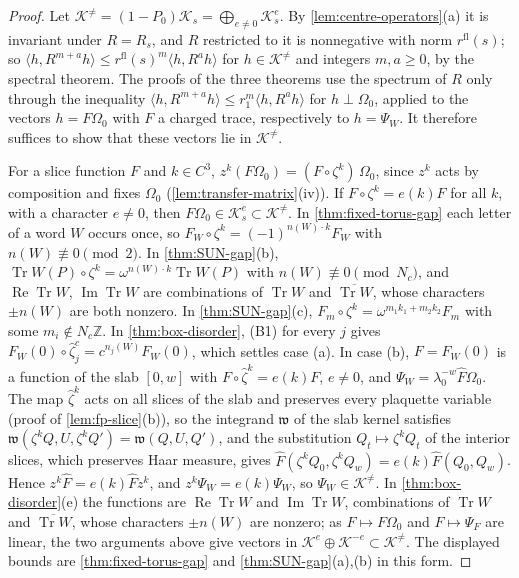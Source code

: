 \documentclass[11pt,a4paper]{amsart}
\theoremstyle{definition}
\theoremstyle{remark}
\numberwithin{equation}{section}
\DeclareMathOperator{\Tr}{Tr}        %
\newcommand{\Z}{\mathbb{Z}}          %
\newcommand{\Kspace}{\mathcal{K}}    %
\newcommand{\ip}[2]{\langle #1,#2\rangle}  %
\newcommand{\lzero}{\lambda_0}             %
\newcommand{\Omegazero}{\Omega_0}          %
\begin{document}
\begin{proof}
Let $\Kspace^{\ne}=(1-P_0)\Kspace_s=\bigoplus_{e\ne0}\Kspace^e_s$. By \cref{lem:centre-operators}\textup{(a)} it is invariant under $R=R_s$, and $R$ restricted to it is nonnegative with norm $r^{\mathrm{fl}}(s)$; so $\ip h{R^{m+a}h}\le r^{\mathrm{fl}}(s)^m\ip h{R^ah}$ for $h\in\Kspace^{\ne}$ and integers $m,a\ge0$, by the spectral theorem. The proofs of the three theorems use the spectrum of $R$ only through the inequality $\ip h{R^{m+a}h}\le r_1^m\ip h{R^ah}$ for $h\perp\Omegazero$, applied to the vectors $h=F\Omegazero$ with $F$ a charged trace, respectively to $h=\Psi_W$. It therefore suffices to show that these vectors lie in $\Kspace^{\ne}$.

For a slice function $F$ and $k\in C^3$, $z^k(F\Omegazero)=(F\circ\zeta^k)\,\Omegazero$, since $z^k$ acts by composition and fixes $\Omegazero$ (\cref{lem:transfer-matrix}\textup{(iv)}). If $F\circ\zeta^k=e(k)F$ for all $k$, with a character $e\ne0$, then $F\Omegazero\in\Kspace^e_s\subset\Kspace^{\ne}$. In \cref{thm:fixed-torus-gap} each letter of a word $W$ occurs once, so $F_W\circ\zeta^k=(-1)^{n(W)\cdot k}F_W$ with $n(W)\not\equiv0\pmod2$. In \cref{thm:SUN-gap}\textup{(b)}, $\Tr W(P)\circ\zeta^k=\omega^{n(W)\cdot k}\Tr W(P)$ with $n(W)\not\equiv0\pmod{N_c}$, and $\operatorname{Re}\Tr W$, $\operatorname{Im}\Tr W$ are combinations of $\Tr W$ and $\overline{\Tr W}$, whose characters $\pm n(W)$ are both nonzero. In \cref{thm:SUN-gap}\textup{(c)}, $F_m\circ\zeta^k=\omega^{m_1k_1+m_2k_2}F_m$ with some $m_i\notin N_c\Z$. In \cref{thm:box-disorder}, \textup{(B1)} for every $j$ gives $F_W(0)\circ\hat\zeta^c_j=c^{n_j(W)}F_W(0)$, which settles case \textup{(a)}. In case \textup{(b)}, $F=F_W(0)$ is a function of the slab $[0,w]$ with $F\circ\hat\zeta^k=e(k)F$, $e\ne0$, and $\Psi_W=\lzero^{-w}\hat F\Omegazero$. The map $\hat\zeta^k$ acts on all slices of the slab and preserves every plaquette variable (proof of \cref{lem:fp-slice}\textup{(b)}), so the integrand $\mathfrak w$ of the slab kernel satisfies $\mathfrak w(\zeta^kQ,U,\zeta^kQ')=\mathfrak w(Q,U,Q')$, and the substitution $Q_t\mapsto\zeta^kQ_t$ of the interior slices, which preserves Haar measure, gives $\hat F(\zeta^kQ_0,\zeta^kQ_w)=e(k)\hat F(Q_0,Q_w)$. Hence $z^k\hat F=e(k)\hat Fz^k$, and $z^k\Psi_W=e(k)\Psi_W$, so $\Psi_W\in\Kspace^{\ne}$. In \cref{thm:box-disorder}\textup{(e)} the functions are $\operatorname{Re}\Tr W$ and $\operatorname{Im}\Tr W$, combinations of $\Tr W$ and $\overline{\Tr W}$, whose characters $\pm n(W)$ are nonzero; as $F\mapsto F\Omegazero$ and $F\mapsto\Psi_F$ are linear, the two arguments above give vectors in $\Kspace^{e}\oplus\Kspace^{-e}\subset\Kspace^{\ne}$. The displayed bounds are \cref{thm:fixed-torus-gap} and \cref{thm:SUN-gap}\textup{(a),(b)} in this form.
\end{proof}
\end{document}
